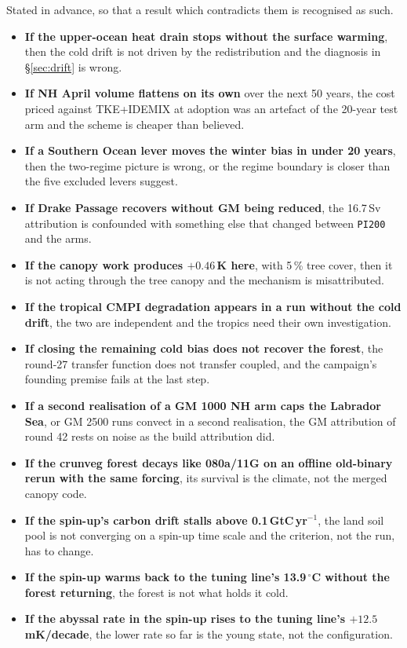 \documentclass[10pt]{article}
\begin{document}
Stated in advance, so that a result which contradicts them is recognised as such.

\begin{itemize}\itemsep2pt
\item \textbf{If the upper-ocean heat drain stops without the surface warming}, then the
cold drift is not driven by the redistribution and the diagnosis in \S\ref{sec:drift} is
wrong.
\item \textbf{If NH April volume flattens on its own} over the next 50 years, the cost
priced against TKE+IDEMIX at adoption was an artefact of the 20-year test arm and the
scheme is cheaper than believed.
\item \textbf{If a Southern Ocean lever moves the winter bias in under 20 years}, then the
two-regime picture is wrong, or the regime boundary is closer than the five excluded
levers suggest.
\item \textbf{If Drake Passage recovers without GM being reduced}, the 16.7\,Sv attribution
is confounded with something else that changed between \texttt{PI200} and the arms.
\item \textbf{If the canopy work produces $+0.46$\,K here}, with 5\,\% tree cover, then it
is not acting through the tree canopy and the mechanism is misattributed.
\item \textbf{If the tropical CMPI degradation appears in a run without the cold drift},
the two are independent and the tropics need their own investigation.
\item \textbf{If closing the remaining cold bias does not recover the forest}, the round-27
transfer function does not transfer coupled, and the campaign's founding premise fails at
the last step.
\item \textbf{If a second realisation of a GM 1000 NH arm caps the Labrador Sea}, or GM 2500 runs
convect in a second realisation, the GM attribution of round 42 rests on noise as the build
attribution did.
\item \textbf{If the crunveg forest decays like 080a/11G on an offline old-binary rerun with the
same forcing}, its survival is the climate, not the merged canopy code.
\item \textbf{If the spin-up's carbon drift stalls above 0.1\,GtC\,yr$^{-1}$}, the land soil pool is
not converging on a spin-up time scale and the criterion, not the run, has to change.
\item \textbf{If the spin-up warms back to the tuning line's 13.9\,$^\circ$C without the forest
returning}, the forest is not what holds it cold.
\item \textbf{If the abyssal rate in the spin-up rises to the tuning line's $+12.5$\,mK/decade}, the
lower rate so far is the young state, not the configuration.
\end{itemize}
\end{document}
